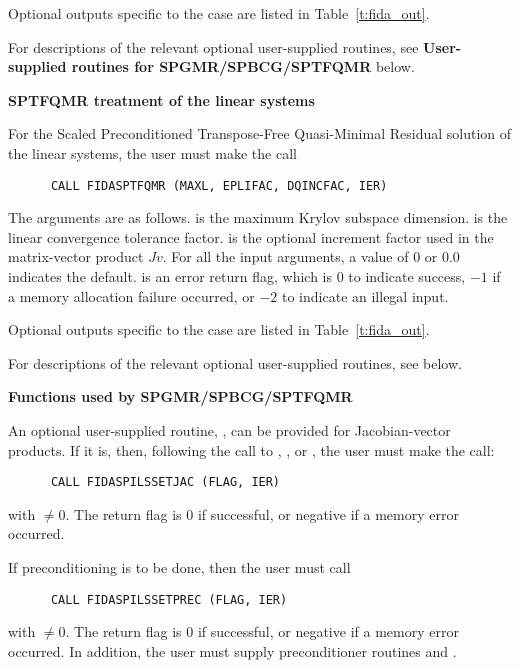 \begin{Steps}
  Optional outputs specific to the {\spbcg} case are listed in
  Table~\ref{t:fida_out}.

  For descriptions of the relevant optional user-supplied routines, see 
  {\bf User-supplied routines for SPGMR/SPBCG/SPTFQMR} below.


  {\s}{\p} {\bf SPTFQMR treatment of the linear systems}
  
  For the Scaled Preconditioned Transpose-Free Quasi-Minimal Residual solution of
  the linear systems, the user must make the call
\begin{verbatim}
      CALL FIDASPTFQMR (MAXL, EPLIFAC, DQINCFAC, IER)
\end{verbatim}
  The arguments are as follows.
   is the maximum Krylov subspace dimension.
   is the linear convergence tolerance factor.
   is the optional increment factor used in the matrix-vector product
  $Jv$.
  For all the input arguments, a value of 0 or $0.0$ indicates the default.
   is an error return flag, which is $0$ to indicate success, $-1$
  if a memory allocation failure occurred, or $-2$ to indicate an illegal input.
  
  Optional outputs specific to the {\sptfqmr} case are listed in
  Table~\ref{t:fida_out}.

  For descriptions of the relevant optional user-supplied routines, see 
  below.

  
  {\s}{\p} {\bf Functions used by SPGMR/SPBCG/SPTFQMR}
  
  An optional user-supplied routine, , can be provided for
  Jacobian-vector products.  If it is, then, following the call to
  , , or , the user must make the call:
\begin{verbatim}
      CALL FIDASPILSSETJAC (FLAG, IER)
\end{verbatim}
  with  $\neq 0$.  The return flag  is 0 if successful,
  or negative if a memory error occurred.

  If preconditioning is to be done, then the user must call
\begin{verbatim}
      CALL FIDASPILSSETPREC (FLAG, IER)
\end{verbatim}
  with  $\neq 0$.  The return flag  is 0 if successful,
  or negative if a memory error occurred.  In addition, the user must
  supply preconditioner routines  and .


\end{Steps}
